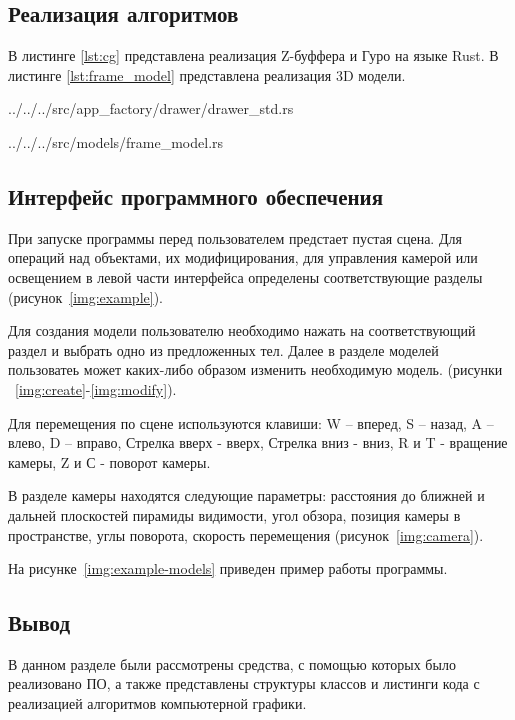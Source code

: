 \subsection{Реализация алгоритмов}
В листинге \ref{lst:cg} представлена реализация Z-буффера и Гуро на языке Rust.
В листинге \ref{lst:frame_model} представлена реализация 3D модели.

\begin{lstinputlisting}[
        caption={Реализация алгоритмов компьютерной графики.},
        label={lst:cg},
        style={rust},
        linerange={33-262}
    ]{../../../src/app_factory/drawer/drawer_std.rs}
\end{lstinputlisting}

\begin{lstinputlisting}[
        caption={Реализация 3D модели.},
        label={lst:frame_model},
        style={rust},
        linerange={24-290}
    ]{../../../src/models/frame_model.rs}
\end{lstinputlisting}

\subsection{Интерфейс программного обеспечения}

При запуске программы перед пользователем предстает пустая сцена. 
Для операций над объектами, их модифицирования, для управления камерой или освещением в левой части интерфейса определены соответствующие разделы (рисунок~\ref{img:example}).


Для создания модели пользователю необходимо нажать на соответствующий раздел и выбрать одно из предложенных тел. Далее в разделе моделей пользоватеь может каких-либо образом изменить необходимую модель. (рисунки ~\ref{img:create}-\ref{img:modify}).

\clearpage


Для перемещения по сцене используются клавиши: W – вперед, S – назад, A – влево, D – вправо, Стрелка вверх - вверх, Стрелка вниз - вниз, R и T - вращение камеры, Z и С - поворот камеры. 

В разделе камеры находятся следующие параметры: расстояния до ближней и дальней плоскостей пирамиды видимости, угол обзора, позиция камеры в пространстве, углы поворота, скорость перемещения (рисунок~\ref{img:camera}).


\clearpage

На рисунке~\ref{img:example-models} приведен пример работы программы.

\subsection*{Вывод}

В данном разделе были рассмотрены средства, с помощью которых было реализовано ПО, а также представлены структуры классов и листинги кода с реализацией алгоритмов компьютерной графики.
